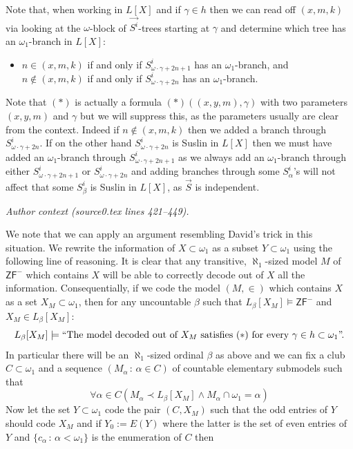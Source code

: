 \documentclass[10pt,a4paper]{amsart}
\providecommand{\ldq}{\textquotedblleft}
\providecommand{\rdq}{\textquotedblright}
\newcommand{\ZFP}{\mathsf{ZF}^-}
\begin{document}
Note that, when working in $L[X]$ and if $\gamma \in h$ then
 we can read off $(x,m,k)$ via looking at the $\omega$-block of $\vec{S^i}$-trees starting at $\gamma$ and determine which tree has an $\omega_1$-branch in $L[X]$:
\begin{itemize}
 \item[$(\ast)$]  $n \in (x,m,k)$ if and only if $S^i_{\omega \cdot \gamma +2n+1}$ has an $\omega_1$-branch, and $n \notin (x,m,k)$ if and only if $S^i_{\omega \cdot \gamma +2n}$ has an $\omega_1$-branch.
\end{itemize}
Note that $(\ast)$ is actually a formula $(\ast) ((x,y,m) ,\gamma)$ with two parameters $(x,y,m)$ and $\gamma$ but we will suppress this, as the parameters usually are clear from the context.
Indeed if $n \notin (x,m,k)$ then we added a branch through $S^i_{\omega \cdot \gamma+ 2n}$. If on the other hand $S^i_{\omega \cdot\gamma +2n}$ is 
Suslin in $L[X]$ then we must have added an $\omega_1$-branch through $S^i_{\omega \cdot \gamma +2n+1}$ as we always add an $\omega_1$-branch through either $S^i_{\omega \cdot \gamma +2n+1}$ or $S^i_{\omega \cdot \gamma +2n}$ and adding branches through some $S^i_{\alpha}$'s  will not affect that some $S^i_{\beta}$ is Suslin in $L[X]$, as $\vec{S}$ is independent.
\par\medskip\noindent\textit{Author context (source0.tex lines 421--449).}\par\smallskip
We note that we can apply an argument resembling David's trick in this situation. We rewrite the information of $X \subset \omega_1$ as a subset $Y \subset \omega_1$ using the following line of reasoning.
It is clear that any transitive, $\aleph_1$-sized model $M$ of $\ZFP$ which contains $X$ will be able to correctly decode out of $X$ all the information.
Consequentially, if we code the model $(M,\in)$ which contains $X$ as a set $X_M \subset \omega_1$, then for any uncountable $\beta$ such that $L_{\beta}[X_M] \models \ZFP$ and $X_M \in L_{\beta}[X_M]$:
\[L_{\beta}[X_M] \models \text{\ldq The model decoded out of }X_M \text{ satisfies $(\ast)$ for every $\gamma \in h \subset \omega_1$\rdq.} \]
In particular there will be an $\aleph_1$-sized ordinal $\beta$ as above and we can fix a club $C \subset \omega_1$ and a sequence $(M_{\alpha} \, : \, \alpha \in C)$ of countable elementary submodels such that
\[\forall \alpha \in C (M_{\alpha} \prec L_{\beta}[X_M] \land M_{\alpha} \cap \omega_1 = \alpha)\]
Now let the set $Y\subset \omega_1$ code the pair $(C, X_M)$ such that the odd entries of $Y$ should code $X_M$ and if $Y_0:=E(Y)$ where the latter is the set of even entries of $Y$ and $\{c_{\alpha} \, : \, \alpha < \omega_1\}$ is the enumeration of $C$ then
\end{document}
